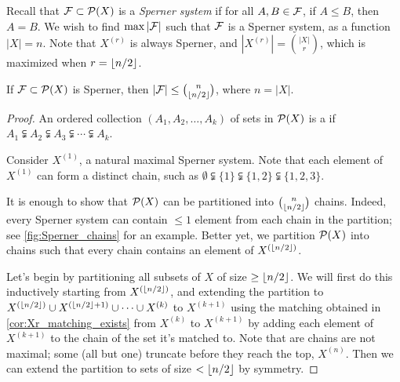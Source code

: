 Recall that $\F\subset \P(X)$ is a \emph{Sperner system} if for all $A,B\in \F$, if $A\leq B$, then $A=B$.
We wish to find $\max |\F|$ such that $\F$ is a Sperner system, as a function $|X| = n$. Note that $X^{(r)}$ is always Sperner, and $|X^{(r)}| = {|X| \choose r}$, which is maximized when $r = \floor{n/2}$.
\begin{theorem} \label{thm:sperner}
If $\F\subset \P(X)$ is Sperner, then $|\F| \leq {n \choose \floor{n/2}}$, where $n=|X|$.
\end{theorem}
\begin{proof}	
An ordered collection $(A_1,A_2,\dotsc, A_k)$ of sets  in $\P(X)$  is a  if $A_1\subsetneqq A_2 \subsetneqq A_3 \subsetneqq\dotsm \subsetneqq A_k$. 
\begin{marginfigure}
\begin{center}
\end{center}
\caption{Consider $X^{(1)}$, a natural maximal Sperner system. Note that each element of $X^{(1)}$ can form a distinct chain, such as $\emptyset \subsetneqq \{1\} \subsetneqq \{1,2\} \subsetneqq \{1,2,3\}$.}\label{fig:Sperner_chains}
\end{marginfigure}
It is enough to show that $\P(X)$ can be partitioned into ${n \choose \floor{n/2}}$ chains. Indeed, every Sperner system can contain $\leq 1$ element from each chain in the partition; see \cref{fig:Sperner_chains} for an example.
Better yet, we partition $\P(X)$ into chains such that every chain contains an element of $X^{(\floor{n/2})}$. 

Let's begin by partitioning all subsets of $X$ of size $\geq \floor{n/2}$.
We will first do this inductively starting from $X^{(\floor{n/2})}$, and extending the partition to $X^{(\floor{n/2})}\cup X^{(\floor{n/2}+1)}\cup\dotsm \cup X^{(k)}$ to $X^{(k+1)}$ using the matching obtained in \cref{cor:Xr_matching_exists} from $X^{(k)}$ to $X^{(k+1)}$ by adding each element of $X^{(k+1)}$ to the chain of the set it's matched to. Note that are chains are not maximal; some (all but one) truncate before they reach the top, $X^{(n)}$.
Then we can extend the partition to sets of size $< \floor{n/2}$ by symmetry.
\end{proof}
